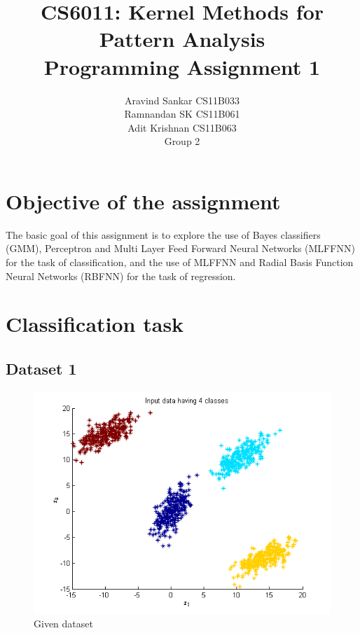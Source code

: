 \documentclass{article}
\begin{document}
\title{\textbf{CS6011: Kernel Methods for Pattern Analysis}
\\
\textbf{Programming Assignment 1}
}
\author{Aravind Sankar CS11B033 \\
Ramnandan SK CS11B061 \\
Adit Krishnan CS11B063 \\[0.2in]
Group 2
}
\maketitle
\tableofcontents 
\newpage
\section{Objective of the assignment}
The basic goal of this assignment is to explore the use of Bayes classifiers (GMM), Perceptron and Multi Layer Feed Forward Neural Networks (MLFFNN) for the task of classification, and the use of MLFFNN and Radial Basis Function Neural Networks (RBFNN) for the task of regression.

\section{Classification task}
\subsection{Dataset 1}

\begin{figure}[H]
\centering
\includegraphics[width=\linewidth]{Classification/linearlySeparable/input_data.png}
\caption{Given dataset}
\end{figure}
\end{document}
